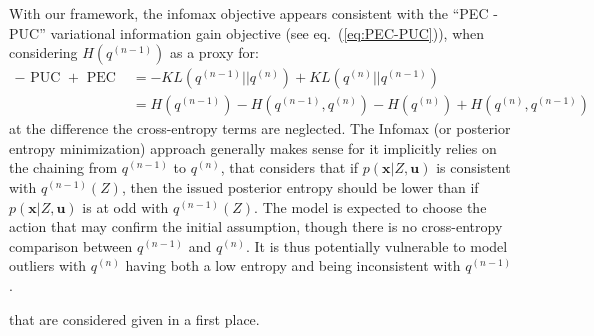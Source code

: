 \documentclass{article}
\begin{document}
With our framework, the infomax objective appears consistent with the ``PEC - PUC'' variational information gain objective (see eq.~(\ref{eq:PEC-PUC})),  
when considering $H(q^{(n-1)})$ as a proxy for: 
\begin{align*}
-\text{ PUC } + \text{ PEC } &= -KL(q^{(n-1)}||q^{(n)})  + KL(q^{(n)}||q^{(n-1)})\\
&=  H(q^{(n-1)}) - H(q^{(n-1)}, q^{(n)}) - H(q^{(n)}) + H(q^{(n)}, q^{(n-1)})
\end{align*}
at the difference the cross-entropy terms are neglected. The Infomax (or posterior entropy minimization) approach generally makes sense for it implicitly relies on the chaining from $q^{(n-1)}$ to $q^{(n)}$, that considers that if $p(\boldsymbol{x}|Z, \boldsymbol{u})$ is consistent with $q^{(n-1)}(Z)$, then the issued posterior entropy should be lower than if $p(\boldsymbol{x}|Z, \boldsymbol{u})$ is at odd with $q^{(n-1)}(Z)$. The model is expected to choose the action that may confirm the initial assumption, though there is no cross-entropy comparison between $q^{(n-1)}$ and $q^{(n)}$.
It is thus potentially vulnerable to model outliers with $q^{(n)}$ having both a low entropy and being inconsistent with $q^{(n-1)}$. 


 that are considered given in a first place. 
\end{document}
